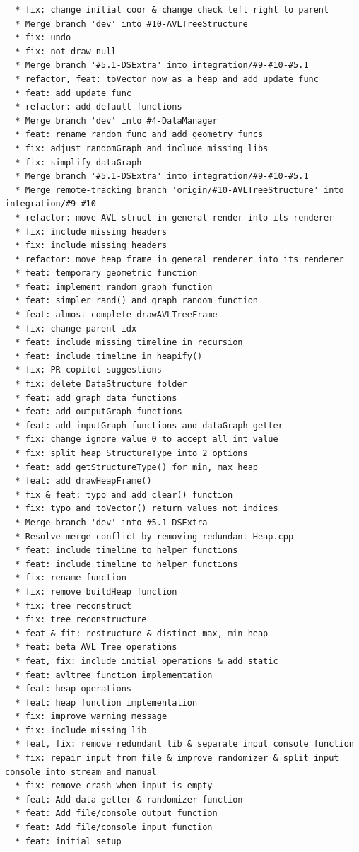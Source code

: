 \begin{small}
\begin{verbatim}
  * fix: change initial coor & change check left right to parent
  * Merge branch 'dev' into #10-AVLTreeStructure
  * fix: undo
  * fix: not draw null
  * Merge branch '#5.1-DSExtra' into integration/#9-#10-#5.1
  * refactor, feat: toVector now as a heap and add update func
  * feat: add update func
  * refactor: add default functions
  * Merge branch 'dev' into #4-DataManager
  * feat: rename random func and add geometry funcs
  * fix: adjust randomGraph and include missing libs
  * fix: simplify dataGraph
  * Merge branch '#5.1-DSExtra' into integration/#9-#10-#5.1
  * Merge remote-tracking branch 'origin/#10-AVLTreeStructure' into integration/#9-#10
  * refactor: move AVL struct in general render into its renderer
  * fix: include missing headers
  * fix: include missing headers
  * refactor: move heap frame in general renderer into its renderer
  * feat: temporary geometric function
  * feat: implement random graph function
  * feat: simpler rand() and graph random function
  * feat: almost complete drawAVLTreeFrame
  * fix: change parent idx
  * feat: include missing timeline in recursion
  * feat: include timeline in heapify()
  * fix: PR copilot suggestions
  * fix: delete DataStructure folder
  * feat: add graph data functions
  * feat: add outputGraph functions
  * feat: add inputGraph functions and dataGraph getter
  * fix: change ignore value 0 to accept all int value
  * fix: split heap StructureType into 2 options
  * feat: add getStructureType() for min, max heap
  * feat: add drawHeapFrame()
  * fix & feat: typo and add clear() function
  * fix: typo and toVector() return values not indices
  * Merge branch 'dev' into #5.1-DSExtra
  * Resolve merge conflict by removing redundant Heap.cpp
  * feat: include timeline to helper functions
  * feat: include timeline to helper functions
  * fix: rename function
  * fix: remove buildHeap function
  * fix: tree reconstruct
  * fix: tree reconstructure
  * feat & fit: restructure & distinct max, min heap
  * feat: beta AVL Tree operations
  * feat, fix: include initial operations & add static
  * feat: avltree function implementation
  * feat: heap operations
  * feat: heap function implementation
  * fix: improve warning message
  * fix: include missing lib
  * feat, fix: remove redundant lib & separate input console function
  * fix: repair input from file & improve randomizer & split input console into stream and manual
  * fix: remove crash when input is empty
  * feat: Add data getter & randomizer function
  * feat: Add file/console output function
  * feat: Add file/console input function
  * feat: initial setup



\end{verbatim}
\end{small}
